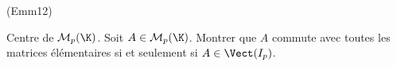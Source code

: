 \begin{tiny}(Emm12)\end{tiny} Centre de $\mathcal{M}_p(\K)$.\newline
Soit $A\in \mathcal{M}_p(\K)$. Montrer que $A$ commute avec toutes les matrices élémentaires si et seulement si $A\in\Vect(I_p)$.